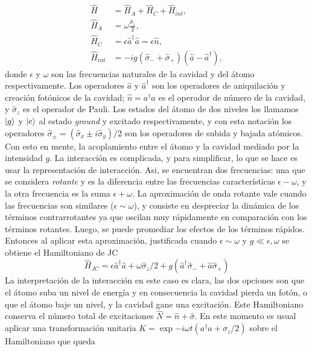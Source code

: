\begin{equation}\label{eq3:hamiltoniano inicial}
\begin{aligned}
    \hat H & = \hat H_A + \hat H_C + \hat H_{int},  \\
    \hat H_A &= \omega \frac{\hat \sigma_z}{2}, \\
    \hat H_C &= \epsilon \hat a^\dagger\hat a = \epsilon \hat n, \\
    \hat H_{int} &= -i g (\hat\sigma_-+\hat \sigma_+)(\hat a - \hat a^\dagger),
\end{aligned}
\end{equation}
donde $\epsilon$ y $\omega$ son las frecuencias naturales de la cavidad y del átomo respectivamente. Los operadores $\hat a$ y $\hat a^\dagger$ son los operadores de aniquilaci\'on y creaci\'on fot\'onicos de la cavidad; $\hat n =a^\dagger a$ es el operador de n\'umero de la cavidad, y $\hat \sigma_z$ es el operador de Pauli. Los estados del átomo de dos niveles los llamamos $\ket{g}$ y $\ket{e}$ al estado \textit{ground} y excitado respectivamente, y con esta notación los operadores $\hat\sigma_\pm = (\hat\sigma_x\pm i\hat\sigma_y)/2$ son los operadores de subida y bajada atómicos. Con esto en mente, la acoplamiento entre el átomo y la cavidad mediado por la intensidad $g$.  
La interacci\'on es complicada, y para simplificar, lo que se hace es usar la representaci\'on de interacci\'on. Asi, se encuentran dos frecuencias: una que se considera \textit{rotante} y es la diferencia entre las frecuencias características $\epsilon-\omega$, y la otra frecuencia es la suma $\epsilon+\omega$. La aproximación de onda rotante vale cuando las frecuencias son similares ($\epsilon\sim\omega$), y consiste en despreciar la dinámica de los términos contrarrotantes ya que oscilan muy rápidamente en comparación con los términos rotantes. Luego, se puede promediar los efectos de los términos rápidos. Entonces al aplicar esta aproximación, justificada cuando $\epsilon\sim\omega$ y $g \ll \epsilon,\omega$ se obtiene el Hamiltoniano de JC \cite{JCoriginal}
\begin{equation}
    \hat H_{JC}=\epsilon \hat a^\dagger \hat a + \omega \hat\sigma_z/2 + g(\hat a^\dagger\hat\sigma_-+\hat a\hat\sigma_+)
\end{equation} 
La interpretaci\'on de la interacci\'on en este caso es clara, las dos opciones son que el átomo suba un nivel de energ\'ia y en consecuencia la cavidad pierda un fot\'on, o que el átomo baje un nivel, y la cavidad gane una excitaci\'on. Este Hamiltoniano conserva el n\'umero total de excitaciones $\hat N= \hat n + \hat \sigma$. En este momento es usual aplicar una transformación unitaria $K=\exp{-i\omega t(a ^\dagger a + \sigma_z/2)}$ sobre el Hamiltoniano que queda 
